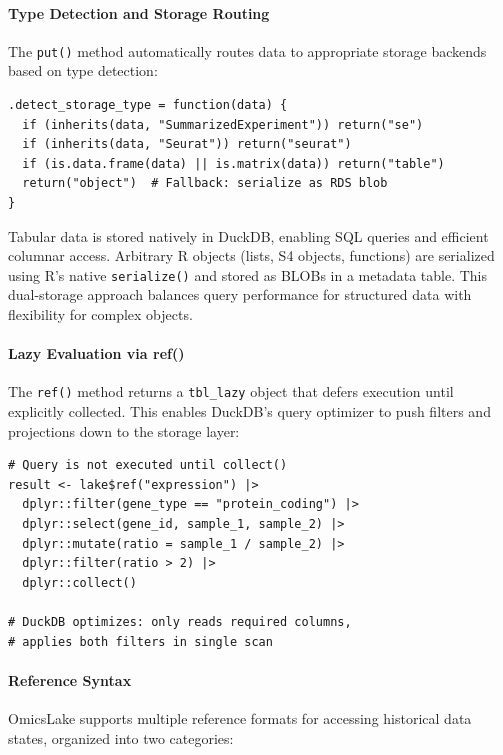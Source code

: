 \documentclass[11pt,a4paper]{article}
\begin{document}
\paragraph{Type Detection and Storage Routing}
The \texttt{put()} method automatically routes data to appropriate storage backends based on type detection:

\begin{lstlisting}[caption={Automatic type detection in put()}]
.detect_storage_type = function(data) {
  if (inherits(data, "SummarizedExperiment")) return("se")
  if (inherits(data, "Seurat")) return("seurat")
  if (is.data.frame(data) || is.matrix(data)) return("table")
  return("object")  # Fallback: serialize as RDS blob
}
\end{lstlisting}

Tabular data is stored natively in DuckDB, enabling SQL queries and efficient columnar access. Arbitrary R objects (lists, S4 objects, functions) are serialized using R's native \texttt{serialize()} and stored as BLOBs in a metadata table. This dual-storage approach balances query performance for structured data with flexibility for complex objects.

\paragraph{Lazy Evaluation via ref()}
The \texttt{ref()} method returns a \texttt{tbl\_lazy} object that defers execution until explicitly collected. This enables DuckDB's query optimizer to push filters and projections down to the storage layer:

\begin{lstlisting}[caption={Lazy evaluation enables query pushdown}]
# Query is not executed until collect()
result <- lake$ref("expression") |>
  dplyr::filter(gene_type == "protein_coding") |>
  dplyr::select(gene_id, sample_1, sample_2) |>
  dplyr::mutate(ratio = sample_1 / sample_2) |>
  dplyr::filter(ratio > 2) |>
  dplyr::collect()

# DuckDB optimizes: only reads required columns,
# applies both filters in single scan
\end{lstlisting}

\paragraph{Reference Syntax}
OmicsLake supports multiple reference formats for accessing historical data states, organized into two categories:
\end{document}
